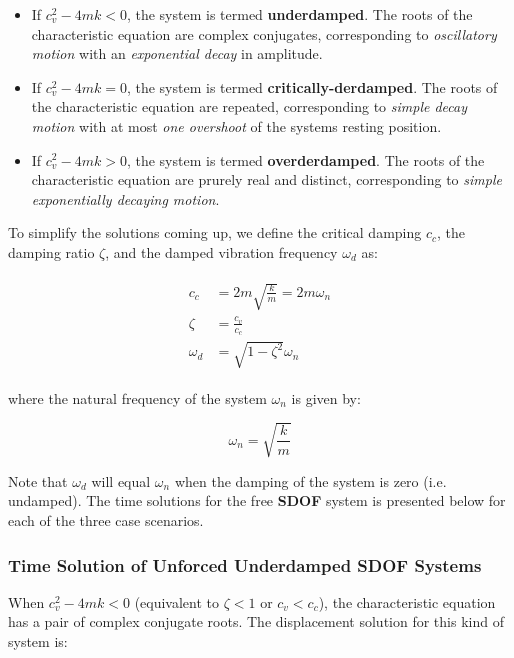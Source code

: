 \documentclass[10pt,b5paper,titlepage]{book}
\newenvironment{eqarray}
{
    \begin{eqnarray}
        \begin{aligned}
}
{
        \end{aligned}
    \end{eqnarray}
}
\begin{document}
\begin{itemize}
    \item If $ c_v^2 - 4 m k < 0 $, the system is termed \textbf{underdamped}.
        The roots of the characteristic equation are complex conjugates,
        corresponding to \textit{oscillatory motion} with an
        \textit{exponential decay} in amplitude.

    \item If $ c_v^2 - 4 m k = 0 $, the system is termed \textbf{critically-derdamped}.
        The roots of the characteristic equation are repeated,
        corresponding to \textit{simple decay motion} with at most
        \textit{one overshoot} of the systems resting position.

    \item If $ c_v^2 - 4 m k > 0 $, the system is termed \textbf{overderdamped}.
        The roots of the characteristic equation are prurely real and distinct,
        corresponding to \textit{simple exponentially decaying motion}.

\end{itemize}

To simplify the solutions coming up, we define the critical damping $ c_c $,
the damping ratio $ \zeta $, and the damped vibration frequency $ \omega_d $ as:

\begin{eqarray}
    c_c &= 2 m \sqrt{\frac{k}{m}} = 2 m \omega_n\\
    \zeta &= \frac{c_v}{c_c}\\
    \omega_d &= \sqrt{1 - \zeta^2} \omega_n
\end{eqarray}

where the natural frequency of the system $ \omega_n $ is given by:

\begin{equation}
    \omega_n = \sqrt{\frac{k}{m}}
\end{equation}

Note that $ \omega_d $ will equal $ \omega_n $ when the damping of the system
is zero (i.e. undamped). The time solutions for the free \textbf{SDOF}
system is presented below for each of the three case scenarios.

\subsubsection{Time Solution of Unforced Underdamped SDOF Systems}

When $ c_v^2 - 4 m k < 0 $ (equivalent to $ \zeta < 1 $ or $ c_v < c_c $),
the characteristic equation has a pair of complex conjugate roots. The displacement
solution for this kind of system is:
\end{document}
